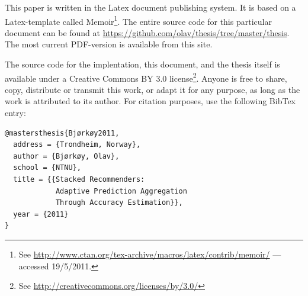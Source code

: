This paper is written in the Latex document publishing system.
It is based on a Latex-template called Memoir\footnote{
See \url{http://www.ctan.org/tex-archive/macros/latex/contrib/memoir/} --- accessed 19/5/2011.}.
The entire source code for this particular document can be found at 
\url{https://github.com/olav/thesis/tree/master/thesis}.
The most current PDF-version is available from this site.

The source code for the implentation, this document, and the thesis itself
is available under a Creative Commons BY 3.0 license\footnote{
See \url{http://creativecommons.org/licenses/by/3.0/}}.
Anyone is free to share, copy, distribute or transmit this work,
or adapt it for any purpose,
as long as the work is attributed to its author.
For citation purposes, use the following BibTex entry:

{
\footnotesize
\begin{verbatim}
@mastersthesis{Bjørkøy2011,
  address = {Trondheim, Norway},
  author = {Bjørkøy, Olav},
  school = {NTNU},
  title = {{Stacked Recommenders: 
            Adaptive Prediction Aggregation
            Through Accuracy Estimation}},
  year = {2011}
} 
\end{verbatim}
}

